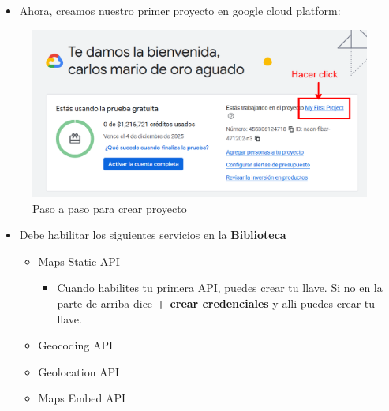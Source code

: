 \documentclass[
]{book}
\providecommand{\tightlist}{%
  \setlength{\itemsep}{0pt}\setlength{\parskip}{0pt}}
\begin{document}
\begin{itemize}
\tightlist
\item
  Ahora, creamos nuestro primer proyecto en google cloud platform:
\end{itemize}

\begin{figure}

{\centering \includegraphics[width=0.7\linewidth]{images/gcp4} 

}

\caption{Paso a paso para crear proyecto}\label{fig:gcp2-fig}
\end{figure}

\begin{itemize}
\item
  Debe habilitar los siguientes servicios en la \textbf{Biblioteca}

  \begin{itemize}
  \tightlist
  \item
    Maps Static API

    \begin{itemize}
    \tightlist
    \item
      Cuando habilites tu primera API, puedes crear tu llave. Si no en la parte de arriba dice \textbf{+ crear credenciales} y alli puedes crear tu llave.
    \end{itemize}
  \item
    Geocoding API
  \item
    Geolocation API
  \item
    Maps Embed API
  \end{itemize}
\end{itemize}
\end{document}
